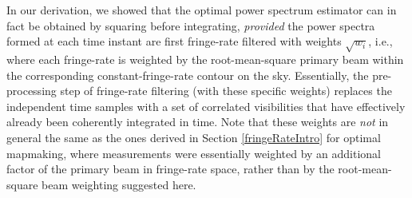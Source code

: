 \documentclass[twocolumn,apj,numberedappendix]{emulateapj}
\begin{document}
In our derivation, we showed that the optimal power spectrum estimator can in fact be obtained by squaring before integrating, \emph{provided} the power spectra formed at each time instant are first fringe-rate filtered with weights $\sqrt{w_i}$, i.e., where each fringe-rate is weighted by the root-mean-square primary beam within the corresponding constant-fringe-rate contour on the sky. Essentially, the pre-processing step of fringe-rate filtering (with these specific weights) replaces the independent time samples with a set of correlated visibilities that have effectively already been coherently integrated in time. Note that these weights are \emph{not} in general the same as the ones derived in Section \ref{fringeRateIntro} for optimal mapmaking, where measurements were essentially weighted by an additional factor of the primary beam in fringe-rate space, rather than by the root-mean-square beam weighting suggested here.
\end{document}
